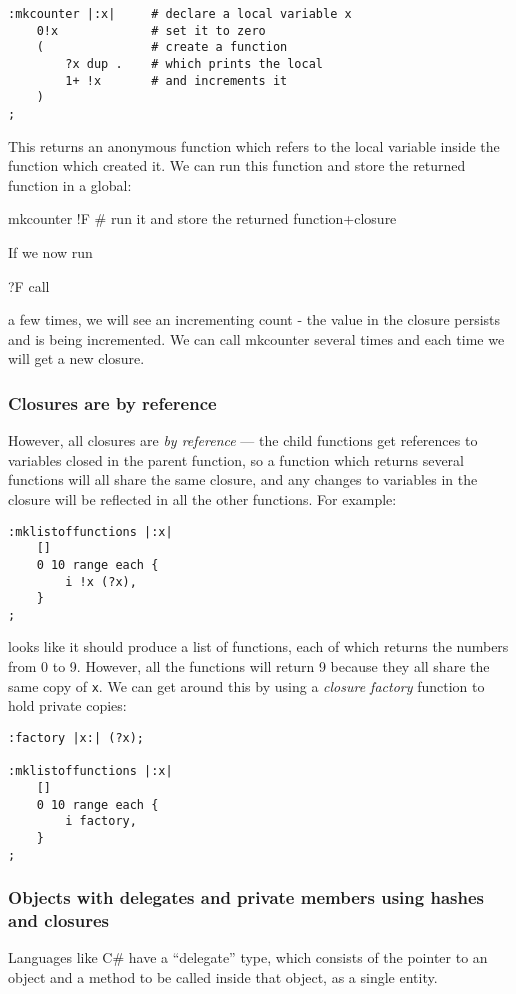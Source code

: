 \begin{lstlisting}
:mkcounter |:x|     # declare a local variable x
    0!x             # set it to zero
    (               # create a function
        ?x dup .    # which prints the local
        1+ !x       # and increments it
    )
;
\end{lstlisting}
This returns an anonymous function which refers to the local variable
inside the function which created it. We can run this function
and store the returned function in a global:

\begin{v}
mkcounter !F    # run it and store the returned function+closure
\end{v}
If we now run
\begin{v}
    ?F call
\end{v}
a few times, we will see an incrementing count - the value in the closure
persists and is being incremented. We can call mkcounter several times and
each time we will get a new closure.

\subsubsection{Closures are by reference}
However, all closures are \emph{by reference} --- the child functions
get references to variables closed in the parent function, so a function
which returns several functions will all share the same closure, and
any changes to variables in the closure will be reflected in all the 
other functions. For example:
\begin{lstlisting}
:mklistoffunctions |:x|
    []
    0 10 range each {
        i !x (?x),
    }
;
\end{lstlisting}
looks like it should produce a list of functions, each of which
returns the numbers from 0 to 9. However, all the functions will
return 9 because they all share the same copy of \texttt{x}.
We can get around this by using a \emph{closure factory} function to hold
private copies:
\begin{lstlisting}
:factory |x:| (?x);

:mklistoffunctions |:x|
    []
    0 10 range each {
        i factory,
    }
;

\end{lstlisting}

\subsubsection{Objects with delegates and private members using hashes and closures}
Languages like C\# have a ``delegate'' type, which consists of
the pointer to an object and a method to be called inside that
object, as a single entity. 

